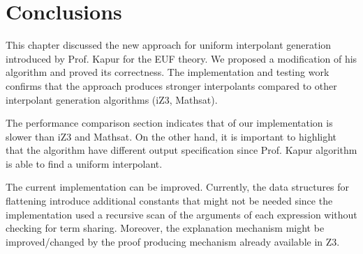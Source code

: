 \section{Conclusions}

This chapter discussed the new approach
for uniform interpolant generation introduced by
Prof. Kapur for the EUF theory. We 
proposed a modification of his algorithm
and proved its correctness. The 
implementation and testing work confirms 
that the approach produces stronger interpolants
compared to other interpolant generation
algorithms (iZ3, Mathsat).

The performance comparison section indicates
that of our implementation is slower 
than iZ3 and Mathsat. 
On the other hand, it is important to 
highlight that the algorithm have different
output specification since Prof. Kapur algorithm
is able to find a uniform interpolant.

The current implementation can be improved. 
Currently, the data structures
for flattening introduce additional constants
that might not be needed since the implementation
used a recursive scan of the arguments of each
expression without checking for term sharing.
Moreover, the explanation mechanism might be
improved/changed by the proof producing mechanism
already available in Z3. 

